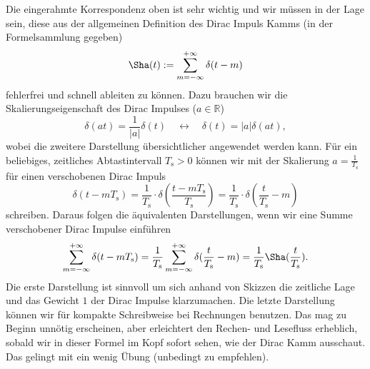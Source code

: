 Die eingerahmte Korrespondenz oben ist sehr wichtig und wir müssen in der Lage sein, diese
aus der allgemeinen Definition des Dirac Impuls Kamms (in der Formelsammlung gegeben)
\begin{equation}
{\Sha}(t) := \sum_{m=-\infty}^{+\infty} \delta(t-m)%
\end{equation}
fehlerfrei und schnell ableiten zu können.
%
Dazu brauchen wir die Skalierungseigenschaft des Dirac Impulses ($a\in\mathbb{R}$)
\begin{equation}
\delta(a t) = \frac{1}{|a|} \delta(t) \quad\longleftrightarrow\quad
\delta(t) = |a| \delta(a t),
\end{equation}
wobei die zweitere Darstellung übersichtlicher angewendet werden kann.
%
Für ein beliebiges, zeitliches Abtastintervall $T_\mathrm{s}>0$ können wir
mit der Skalierung $a=\frac{1}{T_\mathrm{s}}$ für einen verschobenen Dirac Impuls
\begin{equation}
\delta(t - m T_\mathrm{s}) =
\frac{1}{T_\mathrm{s}}\cdot \delta(\frac{t - m T_\mathrm{s}}{T_\mathrm{s}}) =
\frac{1}{T_\mathrm{s}} \cdot \delta(\frac{t}{T_\mathrm{s}}-m)
\end{equation}
schreiben.
%
Daraus folgen die äquivalenten Darstellungen, wenn wir eine Summe
verschobener Dirac Impulse einführen
\begin{equation}
\sum_{m=-\infty}^{+\infty} \delta(t-m T_\mathrm{s}) =
\frac{1}{T_\mathrm{s}}\sum_{m=-\infty}^{+\infty} \delta(\frac{t}{T_\mathrm{s}}-m) =
\frac{1}{T_\mathrm{s}} {\Sha}(\frac{t}{T_\mathrm{s}}).
\end{equation}
Die erste Darstellung ist sinnvoll um sich anhand von Skizzen die zeitliche
Lage und das Gewicht $1$ der Dirac Impulse klarzumachen. Die letzte
Darstellung können wir für kompakte Schreibweise bei Rechnungen benutzen. Das
mag zu Beginn unnötig erscheinen, aber erleichtert den Rechen- und Lesefluss
erheblich, sobald wir in dieser Formel im Kopf sofort sehen, wie der Dirac Kamm
ausschaut. Das gelingt mit ein wenig Übung (unbedingt zu empfehlen).

